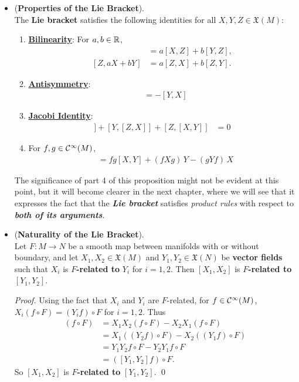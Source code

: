 \documentclass[11pt]{article}
\begin{document}
\begin{itemize}
\item \begin{proposition} (\textbf{Properties of the Lie Bracket}). \\
The \textbf{Lie bracket} satisfies the following identities for all $X, Y, Z \in \mathfrak{X}(M)$:
\begin{enumerate}
\item \underline{\textbf{Bilinearity}}:  For $a,b \in {\mathbb R}$, 
\begin{align*}
[aX +bY, Z] &= a[X, Z] + b [Y, Z], \\
[Z, aX + bY] &= a[Z, X] + b[Z, Y].
\end{align*}
\item \underline{\textbf{Antisymmetry}}:
\begin{align*}
[X, Y] &= - [Y, X]
\end{align*}
\item \underline{\textbf{Jacobi Identity}}:
\begin{align*}
[X, [Y, Z]] + [Y, [Z, X]] + [Z, [X, Y]]&= 0 
\end{align*}
\item For $f, g \in {\mathcal C}^{\infty}(M)$, 
\begin{align}
[fX, gY] &= fg [X, Y] + (fXg)\, Y - (gYf)\,X \label{eqn: lie_bracket_scale_by_fun}
\end{align}
\end{enumerate}
\end{proposition} 

The significance of part 4 of this proposition might not be evident at this point, but it will become clearer in the next chapter, where we will see that it expresses the
fact that the \emph{\textbf{Lie bracket}} satisfies \emph{product rules} with respect to \emph{\textbf{both of its arguments}}.

\item  \begin{proposition} (\textbf{Naturality of the Lie Bracket}). \citep{lee2003introduction} \\
Let $F: M \rightarrow N$ be a smooth map between manifolds with or without boundary, and let $X_1, X_2\in \mathfrak{X}(M)$ and
$Y_1, Y_2\in \mathfrak{X}(N)$ be \textbf{vector fields} such that $X_i$ is \textbf{$F$-related to} $Y_i$ for $i= 1,2$. Then $[X_1, X_2]$ is \textbf{$F$-related to} $[Y_1, Y_2]$.
\end{proposition}
\begin{proof} Using the fact that $X_i$ and $Y_i$ are $F$-related, for $f \in {\mathcal C}^{\infty}(M)$, $X_i(f\circ F) = (Y_i f) \circ F$ for $i=1,2$. Thus
\begin{align*}
[X_1, X_2](f \circ F) &= X_1X_2(f \circ F) - X_2X_1(f \circ F)\\
&= X_1((Y_2 f) \circ F) - X_2((Y_1 f) \circ F) \\
&= Y_1 Y_2 f \circ F - Y_2 Y_1 f \circ F\\
&= ([Y_1, Y_2] f ) \circ F.
\end{align*} So $[X_1, X_2]$ is \textbf{$F$-related to} $[Y_1, Y_2]$. \qed
\end{proof}


\end{itemize}
\end{document}
